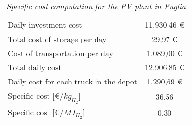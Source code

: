 \begin{table}[h]
\centering
\begin{tabular}{|l|c|}
\hline
\rowcolor{bluepoli!40} \multicolumn{2}{|c|}{\textbf{Specific cost computation - Puglia}}             \\ \hline
\multicolumn{1}{|l|}{Daily investment cost}                  & 11.930,46  €                            \\ \hline
\multicolumn{1}{|l|}{Total cost of storage per day}          & 29,97 €                               \\ \hline
\multicolumn{1}{|l|}{Cost of transportation per day}         & 1.089,00 €                            \\ \hline
\multicolumn{1}{|l|}{Total daily cost}                       & 12.906,85 €                            \\ \hline
\multicolumn{1}{|l|}{Daily cost for each truck in the depot} & 1.290,69  €                              \\ \hline
\multicolumn{1}{|l|}{Specific cost [€/$kg_{H_2}$]}           & 36,56                                 \\ \hline
\multicolumn{1}{|l|}{Specific cost [€/$MJ_{H_2}$]}           & 0,30                                  \\ \hline
\end{tabular}
\caption{\textit{Specific cost computation for the PV plant in Puglia}}
\label{tab:specificcostpuglia}
\end{table}